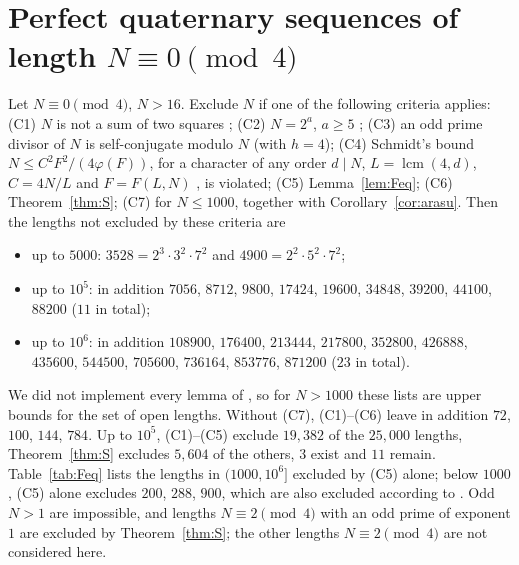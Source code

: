 \appendix
\section{Perfect quaternary sequences of length $N\equiv0\pmod4$}\label{app:quaternary}

\begin{corollary}\label{cor:quaternary}
Let $N\equiv0\pmod4$, $N>16$. Exclude $N$ if one of the following
criteria applies: (C1) $N$ is not a sum of two squares
\cite[Thm.~4.5]{Arasu2011}; (C2) $N=2^a$, $a\ge5$
\cite[Thm.~3.6]{DucSchmidt2019}; (C3) an odd prime divisor of $N$ is
self-conjugate modulo $N$ \cite[Thm.~3.3]{DoDuc2019} (with $h=4$);
(C4) Schmidt's bound $N\le C^2F^2/(4\varphi(F))$, for a character of any
order $d\mid N$, $L=\operatorname{lcm}(4,d)$, $C=4N/L$ and
$F=F(L,N)$ \cite{Schmidt1999,LeungSchmidt2005,LeungSchmidt2012}, is
violated; (C5) Lemma~\ref{lem:Feq}; (C6) Theorem~\ref{thm:S}; (C7) for
$N\le1000$, \cite[Remark after Thm.~4.11]{Arasu2011} together with
Corollary~\ref{cor:arasu}. Then the lengths not excluded by these
criteria are 
\begin{itemize}
\item up to $5000$: $3528=2^3\cdot3^2\cdot7^2$ and $4900=2^2\cdot5^2\cdot7^2$;
\item up to $10^5$: in addition $7056$, $8712$, $9800$, $17424$, $19600$,
$34848$, $39200$, $44100$, $88200$ ($11$ in total);
\item up to $10^6$: in addition $108900$, $176400$, $213444$, $217800$,
$352800$, $426888$, $435600$, $544500$, $705600$, $736164$, $853776$,
$871200$ ($23$ in total).
\end{itemize}
\end{corollary}

We did not implement every lemma of \cite{ArasuDeLauneyMa2002}, so for
$N>1000$ these lists are upper bounds for the set of open lengths. Without
(C7), (C1)--(C6) leave in addition $72$, $100$, $144$, $784$. Up to
$10^5$, (C1)--(C5) exclude $19{,}382$ of the $25{,}000$ lengths,
Theorem~\ref{thm:S} excludes $5{,}604$ of the others, $3$ exist and $11$
remain. Table~\ref{tab:Feq} lists the lengths in $(1000,10^6]$ excluded
by (C5) alone; below $1000$, (C5) alone excludes $200$, $288$, $900$,
which are also excluded according to \cite{Arasu2011}. Odd $N>1$ are
impossible, and lengths $N\equiv2\pmod4$ with an odd prime of exponent
$1$ are excluded by Theorem~\ref{thm:S}; the other lengths
$N\equiv2\pmod4$ are not considered here.

